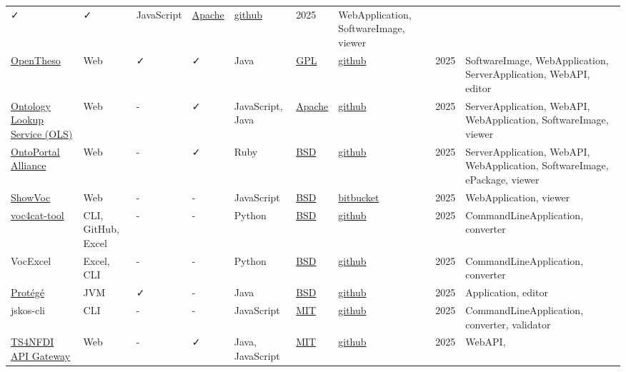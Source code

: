 \documentclass[
  DIV=10]{article}
\begin{document}
\begin{longtable}[]{@{}lllllllll@{}}
✓ & ✓ & JavaScript & \href{https://spdx.org/licenses/Apache-2.0}{Apache}
& \href{https://github.com/skohub-io/skohub-vocabs}{github} & 2025 &
WebApplication, SoftwareImage, viewer \\
\href{https://opentheso.hypotheses.org/}{OpenTheso} & Web & ✓ & ✓ & Java
& \href{https://spdx.org/licenses/GPL-3.0-or-later}{GPL} &
\href{https://github.com/miledrousset/Opentheso}{github} & 2025 &
SoftwareImage, WebApplication, ServerApplication, WebAPI, editor \\
\href{https://github.com/EBISPOT/ols4}{Ontology Lookup Service (OLS)} &
Web & - & ✓ & JavaScript, Java &
\href{https://spdx.org/licenses/Apache-2.0}{Apache} &
\href{https://github.com/EBISPOT/OLS}{github} & 2025 &
ServerApplication, WebAPI, WebApplication, SoftwareImage, viewer \\
\href{https://ontoportal.org/}{OntoPortal Alliance} & Web & - & ✓ & Ruby
& \href{https://spdx.org/licenses/BSD-3-Clause}{BSD} &
\href{https://github.com/ontoportal}{github} & 2025 & ServerApplication,
WebAPI, WebApplication, SoftwareImage, ePackage, viewer \\
\href{https://showvoc.uniroma2.it/}{ShowVoc} & Web & - & - & JavaScript
& \href{https://spdx.org/licenses/BSD-3-Clause}{BSD} &
\href{https://bitbucket.org/art-uniroma2/showvoc/src/master/}{bitbucket}
& 2025 & WebApplication, viewer \\
\href{https://github.com/nfdi4cat/voc4cat-tool/}{voc4cat-tool} & CLI,
GitHub, Excel & - & - & Python &
\href{https://spdx.org/licenses/BSD-3-Clause}{BSD} &
\href{https://github.com/nfdi4cat/voc4cat-tool/}{github} & 2025 &
CommandLineApplication, converter \\
VocExcel & Excel, CLI & - & - & Python &
\href{https://spdx.org/licenses/BSD-3-Clause}{BSD} &
\href{https://github.com/Kurrawong/VocExcel}{github} & 2025 &
CommandLineApplication, converter \\
\href{https://protege.stanford.edu/}{Protégé} & JVM & ✓ & - & Java &
\href{https://spdx.org/licenses/BSD-3-Clause}{BSD} &
\href{https://github.com/protegeproject/protege}{github} & 2025 &
Application, editor \\
jskos-cli & CLI & - & - & JavaScript &
\href{https://spdx.org/licenses/MIT}{MIT} &
\href{https://github.com/gbv/jskos-cli/}{github} & 2025 &
CommandLineApplication, converter, validator \\
\href{https://ts4nfdi.github.io/api-gateway/}{TS4NFDI API Gateway} & Web
& - & ✓ & Java, JavaScript & \href{https://spdx.org/licenses/MIT}{MIT} &
\href{https://github.com/ts4nfdi/api-gateway}{github} & 2025 & WebAPI,

\end{longtable}
\end{document}
